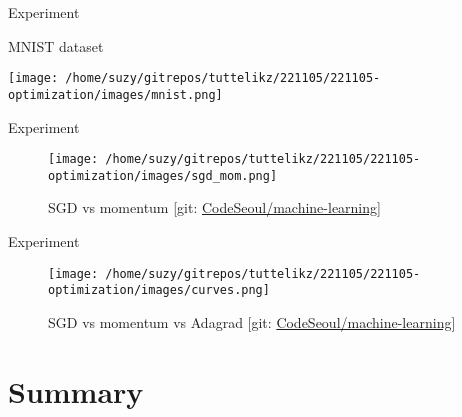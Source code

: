 \documentclass{beamer}
\begin{document}
    \nocite{*}


    \begin{frame}{Experiment}
      \begin{flushleft}
        MNIST dataset ~\cite{lecun1998gradient}
      \end{flushleft}
      \vspace{0.1cm}
      \begin{center}
          \texttt{[image: /home/suzy/gitrepos/tuttelikz/221105/221105-optimization/images/mnist.png]}
      \end{center}
    \end{frame}

    \begin{frame}{Experiment}
      \begin{figure}[htb]
        \begin{center}
          \texttt{[image: /home/suzy/gitrepos/tuttelikz/221105/221105-optimization/images/sgd\_mom.png]}
        \end{center}
        \begin{center}
          \caption{SGD vs momentum [git: \href{https://github.com/CodeSeoul/machine-learning/tree/master/221105-optimization}{CodeSeoul/machine-learning}]}
        \end{center}
      \end{figure}
    \end{frame}

    \begin{frame}{Experiment}
      \begin{figure}[htb]
      \centering
        \texttt{[image: /home/suzy/gitrepos/tuttelikz/221105/221105-optimization/images/curves.png]}
        \caption{SGD vs momentum vs Adagrad [git: \href{https://github.com/CodeSeoul/machine-learning/tree/master/221105-optimization}{CodeSeoul/machine-learning}]}
      \end{figure}
    \end{frame}
    

    \section{Summary} %
\end{document}
